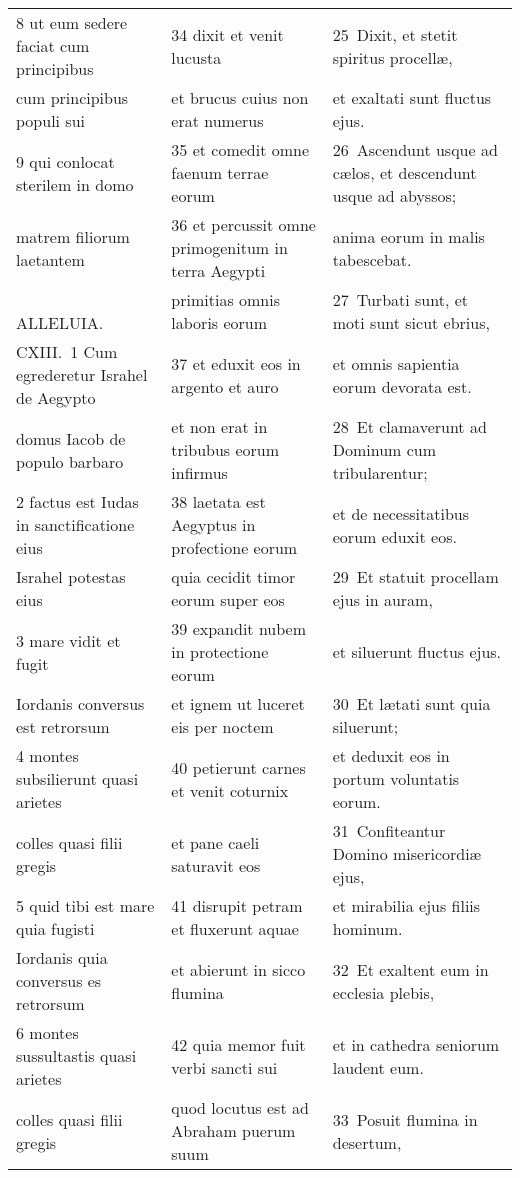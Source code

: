 \documentclass{article}
\begin{document}
\begin{longtable}{@{}p{}p{}p{}@{}}
8 ut eum sedere faciat cum principibus	&	34 dixit et venit lucusta	&	25 Dixit, et stetit spiritus procellæ,	\\
cum principibus populi sui	&	et brucus cuius non erat numerus	&	et exaltati sunt fluctus ejus.	\\
9 qui conlocat sterilem in domo	&	35 et comedit omne faenum terrae eorum	&	26 Ascendunt usque ad cælos, et descendunt usque ad abyssos;	\\
matrem filiorum laetantem	&	36 et percussit omne primogenitum in terra Aegypti	&	anima eorum in malis tabescebat.	\\
    ALLELUIA.	&	primitias omnis laboris eorum	&	27 Turbati sunt, et moti sunt sicut ebrius,	\\
CXIII. 1 Cum egrederetur Israhel de Aegypto	&	37 et eduxit eos in argento et auro	&	et omnis sapientia eorum devorata est.	\\
domus Iacob de populo barbaro	&	et non erat in tribubus eorum infirmus	&	28 Et clamaverunt ad Dominum cum tribularentur;	\\
2 factus est Iudas in sanctificatione eius	&	38 laetata est Aegyptus in profectione eorum	&	et de necessitatibus eorum eduxit eos.	\\
Israhel potestas eius	&	quia cecidit timor eorum super eos	&	29 Et statuit procellam ejus in auram,	\\
3 mare vidit et fugit	&	39 expandit nubem in protectione eorum	&	et siluerunt fluctus ejus.	\\
Iordanis conversus est retrorsum	&	et ignem ut luceret eis per noctem	&	30 Et lætati sunt quia siluerunt;	\\
4 montes subsilierunt quasi arietes	&	40 petierunt carnes et venit coturnix	&	et deduxit eos in portum voluntatis eorum.	\\
colles quasi filii gregis	&	et pane caeli saturavit eos	&	31 Confiteantur Domino misericordiæ ejus,	\\
5 quid tibi est mare quia fugisti	&	41 disrupit petram et fluxerunt aquae	&	et mirabilia ejus filiis hominum.	\\
Iordanis quia conversus es retrorsum	&	et abierunt in sicco flumina	&	32 Et exaltent eum in ecclesia plebis,	\\
6 montes sussultastis quasi arietes	&	42 quia memor fuit verbi sancti sui	&	et in cathedra seniorum laudent eum.	\\
colles quasi filii gregis	&	quod locutus est ad Abraham puerum suum	&	33 Posuit flumina in desertum,	\\

\end{longtable}
\end{document}
